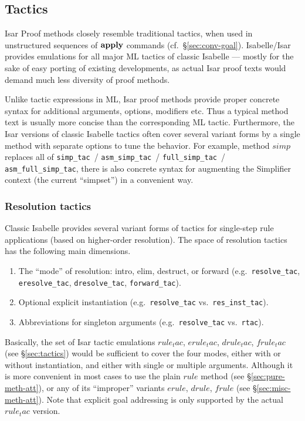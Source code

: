 \subsection{Tactics}\label{sec:conv-tac}

Isar Proof methods closely resemble traditional tactics, when used in
unstructured sequences of ${\mathord{\mathbf{apply}}}$ commands (cf.\ \S\ref{sec:conv-goal}).
Isabelle/Isar provides emulations for all major ML tactics of classic Isabelle
--- mostly for the sake of easy porting of existing developments, as actual
Isar proof texts would demand much less diversity of proof methods.

Unlike tactic expressions in ML, Isar proof methods provide proper concrete
syntax for additional arguments, options, modifiers etc.  Thus a typical
method text is usually more concise than the corresponding ML tactic.
Furthermore, the Isar versions of classic Isabelle tactics often cover several
variant forms by a single method with separate options to tune the behavior.
For example, method $simp$ replaces all of \texttt{simp_tac}~/
\texttt{asm_simp_tac}~/ \texttt{full_simp_tac}~/ \texttt{asm_full_simp_tac},
there is also concrete syntax for augmenting the Simplifier context (the
current ``simpset'') in a convenient way.


\subsubsection{Resolution tactics}

Classic Isabelle provides several variant forms of tactics for single-step
rule applications (based on higher-order resolution).  The space of resolution
tactics has the following main dimensions.
\begin{enumerate}
\item The ``mode'' of resolution: intro, elim, destruct, or forward (e.g.\ 
  \texttt{resolve_tac}, \texttt{eresolve_tac}, \texttt{dresolve_tac},
  \texttt{forward_tac}).
\item Optional explicit instantiation (e.g.\ \texttt{resolve_tac} vs.\ 
  \texttt{res_inst_tac}).
\item Abbreviations for singleton arguments (e.g.\ \texttt{resolve_tac} vs.\ 
  \texttt{rtac}).
\end{enumerate}

Basically, the set of Isar tactic emulations $rule_tac$, $erule_tac$,
$drule_tac$, $frule_tac$ (see \S\ref{sec:tactics}) would be sufficient to
cover the four modes, either with or without instantiation, and either with
single or multiple arguments.  Although it is more convenient in most cases to
use the plain $rule$ method (see \S\ref{sec:pure-meth-att}), or any of its
``improper'' variants $erule$, $drule$, $frule$ (see
\S\ref{sec:misc-meth-att}).  Note that explicit goal addressing is only
supported by the actual $rule_tac$ version.

